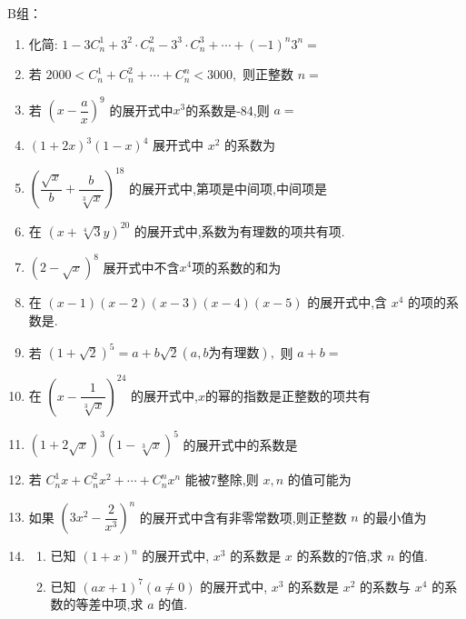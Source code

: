 B组：
\begin{enumerate}
\item 化简: $1-3C_{n}^{1}+3^{2}\cdot C_{n}^{2}-3^{3}\cdot C_{n}^{3}+\cdots+(-1)^{n}3^{n}=$

\item 若 $2000<C_{n}^{1}+C_{n}^{2}+\cdots+C_{n}^{n}<3000,$ 则正整数 $n=$

\item 若 $\left(x-\dfrac{a}{x}\right)^{9}$ 的展开式中$x^3$的系数是-84,则 $a=$

\item $(1+2x)^{3}(1-x)^{4}$ 展开式中 $x^{2}$ 的系数为

\item $\left(\dfrac{\sqrt{x}}{b}+\dfrac{b}{\sqrt[3]{x}}\right)^{18}$ 的展开式中,第项是中间项,中间项是

\item 在 $(x+\sqrt[4]{3}y)^{20}$ 的展开式中,系数为有理数的项共有项.

\item $(2-\sqrt{x})^{8}$ 展开式中不含$x^4$项的系数的和为

\item 在 $(x-1)(x-2)(x-3)(x-4)(x-5)$ 的展开式中,含 $x^{4}$ 的项的系数是.

\item 若 $(1+\sqrt{2})^{5}=a+b\sqrt{2}(a,b\text{为有理数}),$ 则 $a+b=$

\item 在 $\left(x-\dfrac{1}{\sqrt[3]{x}}\right)^{24}$ 的展开式中,$x$的幂的指数是正整数的项共有

\item $(1+2\sqrt{x})^{3}(1-\sqrt[3]{x})^{5}$ 的展开式中的系数是

\item 若 $C_{n}^{1}x+C_{n}^{2}x^{2}+\cdots+C_{n}^{n}x^{n}$ 能被7整除,则 $x,n$ 的值可能为

\item 如果 $\left(3x^{2}-\dfrac{2}{x^{3}}\right)^{n}$ 的展开式中含有非零常数项,则正整数 $n$ 的最小值为

\item 
\begin{enumerate}
    \item 已知 $(1+x)^{n}$ 的展开式中, $x^{3}$ 的系数是 $x$ 的系数的7倍,求 $n$ 的值.
    \item 已知 $(ax+1)^{7}(a\ne0)$ 的展开式中, $x^{3}$ 的系数是 $x^{2}$ 的系数与 $x^{4}$ 的系数的等差中项,求 $a$ 的值.
\end{enumerate}


\end{enumerate}
